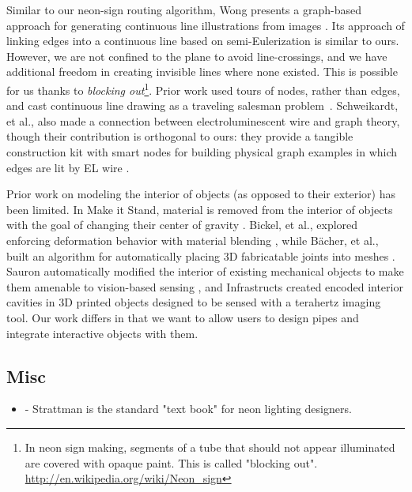 Similar to our neon-sign routing algorithm, Wong presents a graph-based approach for generating continuous line illustrations from images \cite{Wong-continuousline}. Its approach of linking edges into a continuous line based on semi-Eulerization is similar to ours.  However, we are not confined to the plane to avoid line-crossings, and we have additional freedom in creating invisible lines where none existed.  This is possible for us thanks to \emph{blocking out}\footnote{In neon sign making, segments of a tube that should not appear illuminated are covered with opaque paint. This is called "blocking out". \url{http://en.wikipedia.org/wiki/Neon_sign}}. Prior work used tours of nodes, rather than edges, and cast continuous line drawing as a traveling salesman problem~\cite{Bosch-tsp}.  Schweikardt, et al., also made a connection between electroluminescent wire and graph theory, though their contribution is orthogonal to ours: they provide a tangible construction kit with smart nodes for building physical graph examples in which edges are lit by EL wire \cite{Schweikardt-tei09}.

Prior work on modeling the interior of objects (as opposed to their exterior) has been limited.    In Make it Stand, material is removed from the interior of objects with the goal of changing their center of gravity \cite{Prevost-makeitstand}.  Bickel, et al., explored enforcing deformation behavior with material blending \cite{Bickel-deformation}, while B\"{a}cher, et al., built an algorithm for automatically placing 3D fabricatable joints into meshes \cite{Bacher-articulated}.  Sauron automatically modified the interior of existing mechanical objects to make them amenable to vision-based sensing \cite{Savage-sauron}, and Infrastructs created encoded interior cavities in 3D printed objects designed to be sensed with a terahertz imaging tool.  Our work differs in that we want to allow users to design pipes and integrate interactive objects with them.

\subsection{Misc}
\begin{itemize}
\item \cite{strattman1997neon} - Strattman is the standard "text book" for neon lighting designers.
\end{itemize}
